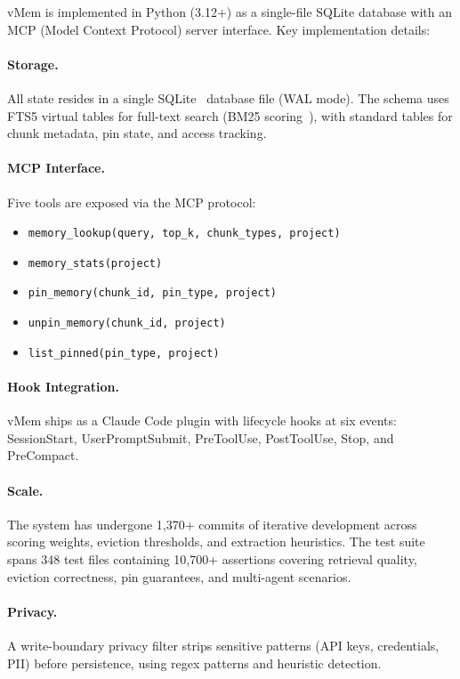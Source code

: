 \documentclass[10pt,twocolumn]{article}
\begin{document}
vMem is implemented in Python (3.12+) as a single-file SQLite database with an MCP (Model Context Protocol) server interface. Key implementation details:

\paragraph{Storage.} All state resides in a single SQLite~\cite{sqlite2020hipp} database file (WAL mode). The schema uses FTS5 virtual tables for full-text search (BM25 scoring~\cite{robertson2009bm25}), with standard tables for chunk metadata, pin state, and access tracking.

\paragraph{MCP Interface.} Five tools are exposed via the MCP protocol:
\begin{itemize}[leftmargin=*,nosep]
  \item \texttt{memory\_lookup(query, top\_k, chunk\_types, project)}
  \item \texttt{memory\_stats(project)}
  \item \texttt{pin\_memory(chunk\_id, pin\_type, project)}
  \item \texttt{unpin\_memory(chunk\_id, project)}
  \item \texttt{list\_pinned(pin\_type, project)}
\end{itemize}

\paragraph{Hook Integration.} vMem ships as a Claude Code plugin with lifecycle hooks at six events: SessionStart, UserPromptSubmit, PreToolUse, PostToolUse, Stop, and PreCompact.

\paragraph{Scale.} The system has undergone 1{,}370+ commits of iterative development across scoring weights, eviction thresholds, and extraction heuristics. The test suite spans 348 test files containing 10{,}700+ assertions covering retrieval quality, eviction correctness, pin guarantees, and multi-agent scenarios.

\paragraph{Privacy.} A write-boundary privacy filter strips sensitive patterns (API keys, credentials, PII) before persistence, using regex patterns and heuristic detection.
\end{document}
